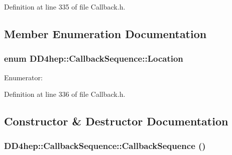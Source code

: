 Definition at line 335 of file Callback.h.

\subsection{Member Enumeration Documentation}
\hypertarget{struct_d_d4hep_1_1_callback_sequence_a7753490247479633aed16a2376821ef7}{
\subsubsection[{Location}]{\setlength{\rightskip}{0pt plus 5cm}enum {\bf DD4hep::CallbackSequence::Location}}}
\label{struct_d_d4hep_1_1_callback_sequence_a7753490247479633aed16a2376821ef7}
\begin{Desc}
\item[Enumerator: ]\par
\begin{description}
\item[{\em 
\hypertarget{struct_d_d4hep_1_1_callback_sequence_a7753490247479633aed16a2376821ef7a3aef5fe72e4b9e6f6f4b20a655e78ef2}{
FRONT}
\label{struct_d_d4hep_1_1_callback_sequence_a7753490247479633aed16a2376821ef7a3aef5fe72e4b9e6f6f4b20a655e78ef2}
}]\item[{\em 
\hypertarget{struct_d_d4hep_1_1_callback_sequence_a7753490247479633aed16a2376821ef7ac39eeb1bcfc1c235ab1d0d9315c310ac}{
END}
\label{struct_d_d4hep_1_1_callback_sequence_a7753490247479633aed16a2376821ef7ac39eeb1bcfc1c235ab1d0d9315c310ac}
}]\end{description}
\end{Desc}



Definition at line 336 of file Callback.h.

\subsection{Constructor \& Destructor Documentation}
\hypertarget{struct_d_d4hep_1_1_callback_sequence_aefd8cccc83fbe0ded44aea01a4da2e77}{
\subsubsection[{CallbackSequence}]{\setlength{\rightskip}{0pt plus 5cm}DD4hep::CallbackSequence::CallbackSequence ()}}
\label{struct_d_d4hep_1_1_callback_sequence_aefd8cccc83fbe0ded44aea01a4da2e77}


